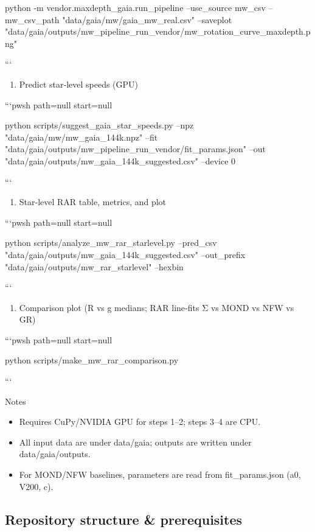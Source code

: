 \documentclass[11pt,a4paper]{article}
\begin{document}
python -m vendor.maxdepth\_gaia.run\_pipeline --use\_source mw\_csv --mw\_csv\_path "data/gaia/mw/gaia\_mw\_real.csv" --saveplot "data/gaia/outputs/mw\_pipeline\_run\_vendor/mw\_rotation\_curve\_maxdepth.png"

```


\begin{enumerate}
\item Predict star‑level speeds (GPU)
\end{enumerate}

```pwsh path=null start=null

python scripts/suggest\_gaia\_star\_speeds.py --npz "data/gaia/mw/mw\_gaia\_144k.npz" --fit "data/gaia/outputs/mw\_pipeline\_run\_vendor/fit\_params.json" --out "data/gaia/outputs/mw\_gaia\_144k\_suggested.csv" --device 0

```


\begin{enumerate}
\item Star‑level RAR table, metrics, and plot
\end{enumerate}

```pwsh path=null start=null

python scripts/analyze\_mw\_rar\_starlevel.py --pred\_csv "data/gaia/outputs/mw\_gaia\_144k\_suggested.csv" --out\_prefix "data/gaia/outputs/mw\_rar\_starlevel" --hexbin

```


\begin{enumerate}
\item Comparison plot (R vs g medians; RAR line‑fits Σ vs MOND vs NFW vs GR)
\end{enumerate}

```pwsh path=null start=null

python scripts/make\_mw\_rar\_comparison.py

```


Notes

\begin{itemize}
\item Requires CuPy/NVIDIA GPU for steps 1–2; steps 3–4 are CPU.
\item All input data are under data/gaia; outputs are written under data/gaia/outputs.
\item For MOND/NFW baselines, parameters are read from fit\_params.json (a0, V200, c).
\end{itemize}


\subsection{Repository structure \& prerequisites}
\end{document}
